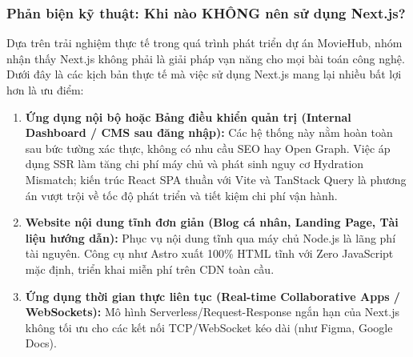 \documentclass[12pt,a4paper]{extarticle}
\begin{document}
\subsubsection{Phản biện kỹ thuật: Khi nào KHÔNG nên sử dụng Next.js?}
Dựa trên trải nghiệm thực tế trong quá trình phát triển dự án MovieHub, nhóm nhận thấy Next.js không phải là giải pháp vạn năng cho mọi bài toán công nghệ. Dưới đây là các kịch bản thực tế mà việc sử dụng Next.js mang lại nhiều bất lợi hơn là ưu điểm:
\begin{enumerate}[noitemsep]
    \item \textbf{Ứng dụng nội bộ hoặc Bảng điều khiển quản trị (Internal Dashboard / CMS sau đăng nhập):} Các hệ thống này nằm hoàn toàn sau bức tường xác thực, không có nhu cầu SEO hay Open Graph. Việc áp dụng SSR làm tăng chi phí máy chủ và phát sinh nguy cơ Hydration Mismatch; kiến trúc React SPA thuần với Vite và TanStack Query là phương án vượt trội về tốc độ phát triển và tiết kiệm chi phí vận hành.
    \item \textbf{Website nội dung tĩnh đơn giản (Blog cá nhân, Landing Page, Tài liệu hướng dẫn):} Phục vụ nội dung tĩnh qua máy chủ Node.js là lãng phí tài nguyên. Công cụ như Astro xuất 100\% HTML tĩnh với Zero JavaScript mặc định, triển khai miễn phí trên CDN toàn cầu.
    \item \textbf{Ứng dụng thời gian thực liên tục (Real-time Collaborative Apps / WebSockets):} Mô hình Serverless/Request-Response ngắn hạn của Next.js không tối ưu cho các kết nối TCP/WebSocket kéo dài (như Figma, Google Docs).
\end{enumerate}
\end{document}
